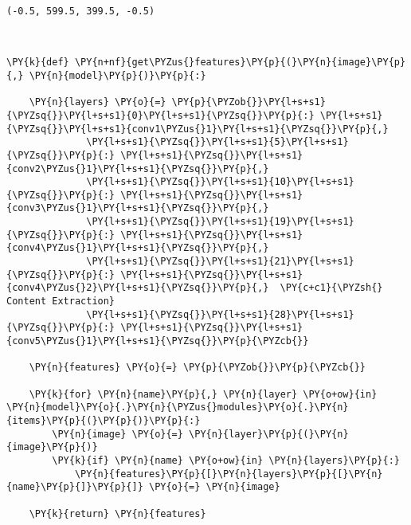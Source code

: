             \begin{tcolorbox}[breakable, size=fbox, boxrule=.5pt, pad at break*=1mm, opacityfill=0]
\begin{Verbatim}[commandchars=\\\{\}]
(-0.5, 599.5, 399.5, -0.5)
\end{Verbatim}
\end{tcolorbox}
        
    \begin{center}
    \end{center}
    { \hspace*{\fill} \\}
    
    \begin{tcolorbox}[breakable, size=fbox, boxrule=1pt, pad at break*=1mm,colback=cellbackground, colframe=cellborder]
\begin{Verbatim}[commandchars=\\\{\}]
\PY{k}{def} \PY{n+nf}{get\PYZus{}features}\PY{p}{(}\PY{n}{image}\PY{p}{,} \PY{n}{model}\PY{p}{)}\PY{p}{:}
   
    \PY{n}{layers} \PY{o}{=} \PY{p}{\PYZob{}}\PY{l+s+s1}{\PYZsq{}}\PY{l+s+s1}{0}\PY{l+s+s1}{\PYZsq{}}\PY{p}{:} \PY{l+s+s1}{\PYZsq{}}\PY{l+s+s1}{conv1\PYZus{}1}\PY{l+s+s1}{\PYZsq{}}\PY{p}{,}
              \PY{l+s+s1}{\PYZsq{}}\PY{l+s+s1}{5}\PY{l+s+s1}{\PYZsq{}}\PY{p}{:} \PY{l+s+s1}{\PYZsq{}}\PY{l+s+s1}{conv2\PYZus{}1}\PY{l+s+s1}{\PYZsq{}}\PY{p}{,} 
              \PY{l+s+s1}{\PYZsq{}}\PY{l+s+s1}{10}\PY{l+s+s1}{\PYZsq{}}\PY{p}{:} \PY{l+s+s1}{\PYZsq{}}\PY{l+s+s1}{conv3\PYZus{}1}\PY{l+s+s1}{\PYZsq{}}\PY{p}{,} 
              \PY{l+s+s1}{\PYZsq{}}\PY{l+s+s1}{19}\PY{l+s+s1}{\PYZsq{}}\PY{p}{:} \PY{l+s+s1}{\PYZsq{}}\PY{l+s+s1}{conv4\PYZus{}1}\PY{l+s+s1}{\PYZsq{}}\PY{p}{,}
              \PY{l+s+s1}{\PYZsq{}}\PY{l+s+s1}{21}\PY{l+s+s1}{\PYZsq{}}\PY{p}{:} \PY{l+s+s1}{\PYZsq{}}\PY{l+s+s1}{conv4\PYZus{}2}\PY{l+s+s1}{\PYZsq{}}\PY{p}{,}  \PY{c+c1}{\PYZsh{} Content Extraction}
              \PY{l+s+s1}{\PYZsq{}}\PY{l+s+s1}{28}\PY{l+s+s1}{\PYZsq{}}\PY{p}{:} \PY{l+s+s1}{\PYZsq{}}\PY{l+s+s1}{conv5\PYZus{}1}\PY{l+s+s1}{\PYZsq{}}\PY{p}{\PYZcb{}}
        
    \PY{n}{features} \PY{o}{=} \PY{p}{\PYZob{}}\PY{p}{\PYZcb{}}

    \PY{k}{for} \PY{n}{name}\PY{p}{,} \PY{n}{layer} \PY{o+ow}{in} \PY{n}{model}\PY{o}{.}\PY{n}{\PYZus{}modules}\PY{o}{.}\PY{n}{items}\PY{p}{(}\PY{p}{)}\PY{p}{:}
        \PY{n}{image} \PY{o}{=} \PY{n}{layer}\PY{p}{(}\PY{n}{image}\PY{p}{)}
        \PY{k}{if} \PY{n}{name} \PY{o+ow}{in} \PY{n}{layers}\PY{p}{:}
            \PY{n}{features}\PY{p}{[}\PY{n}{layers}\PY{p}{[}\PY{n}{name}\PY{p}{]}\PY{p}{]} \PY{o}{=} \PY{n}{image}
            
    \PY{k}{return} \PY{n}{features}
\end{Verbatim}
\end{tcolorbox}

